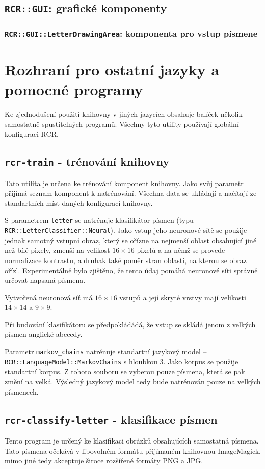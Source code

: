 \documentclass[a4paper]{article}
\begin{document}
\subsection{\texttt{RCR::GUI}: grafické komponenty}
\subsubsection{\texttt{RCR::GUI::LetterDrawingArea}: komponenta pro vstup
písmene}

\section{Rozhraní pro ostatní jazyky a pomocné programy}
Ke zjednodušení použití knihovny v jiných jazycích obsahuje balíček několik
samostatně spustitelných programů. Všechny tyto utility používají globální
konfiguraci RCR.

\subsection{\texttt{rcr-train} - trénování knihovny}
Tato utilita je určena ke trénování komponent knihovny.
Jako svůj parametr přijímá seznam komponent k natrénování.
Všechna data se ukládají a načítají ze standartních míst daných konfigurací
knihovny.

S parametrem \texttt{letter} se natrénuje klasifikátor
písmen (typu \texttt{RCR::LetterClassifier::Neural}). Jako
vstup jeho neuronové sítě se použije jednak samotný vstupní obraz,
který se ořízne na nejmenší oblast obsahující jiné než bílé pixely,
zmenší na velikost $16\times 16$ pixelů a na němž se provede normalizace
kontrastu, a druhak také poměr stran oblasti, na kterou se obraz ořízl.
Experimentálně bylo zjištěno, že tento údaj pomáhá neuronové síti správně
určovat napsaná písmena.

Vytvořená neuronová síť má $16\times 16$ vstupů a její skryté vrstvy mají
velikosti $14\times 14$ a $9\times 9$.

Při budování klasifikátoru se předpokládádá, že vstup se skládá jenom
z velkých písmen anglické abecedy.

Parametr \texttt{markov\_chains} natrénuje standartní jazykový model --
\texttt{RCR::LanguageModel::MarkovChains} s hloubkou 3. Jako korpus se použije
standartní korpus. Z tohoto souboru se vyberou pouze písmena, která se pak změní
na velká. Výsledný jazykový model tedy bude natrénován pouze na velkých
písmenech.

\subsection{\texttt{rcr-classify-letter} - klasifikace písmen}
Tento program je určený ke klasifikaci obrázků obsahujících samostatná písmena.
Tato písmena očekává v libovolném formátu přijímaném knihovnou ImageMagick,
mimo jiné tedy akceptuje široce rozšířené formáty PNG a JPG.
\end{document}
